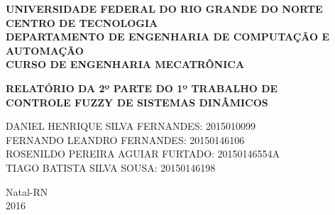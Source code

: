 \documentclass[a4paper,12pt]{article}
\begin{document}
\onehalfspacing

\thispagestyle{empty}

\setcounter{page}{1}


\begin{figure}[!ht]

\centering

\hspace{11.09cm}

\label{Logos}

\end{figure}


\vspace{-1cm}

\begin{center}
{\bf{\normalsize UNIVERSIDADE FEDERAL DO RIO GRANDE DO NORTE\\
CENTRO DE TECNOLOGIA\\
DEPARTAMENTO DE ENGENHARIA DE COMPUTAÇÃO E AUTOMAÇÃO\\
CURSO DE ENGENHARIA MECATRÔNICA
}}


\vspace{6.6cm}

{\bf{\large RELATÓRIO DA 2º PARTE DO 1º TRABALHO DE\\
CONTROLE FUZZY DE SISTEMAS DINÂMICOS\\
}}


\vspace{2.6cm}



\begin{flushright}
\begin{normalsize}
DANIEL HENRIQUE SILVA FERNANDES: 2015010099\\
\vspace{0.8cm}
FERNANDO LEANDRO FERNANDES: 20150146106\\
\vspace{0.8cm}
ROSENILDO PEREIRA AGUIAR FURTADO: 20150146554A\\
\vspace{0.8cm}
TIAGO BATISTA SILVA SOUSA: 20150146198\\
\end{normalsize}
\end{flushright}


\vspace{3.6cm}
{\large Natal-RN\\
2016}
\end{center}
\end{document}
